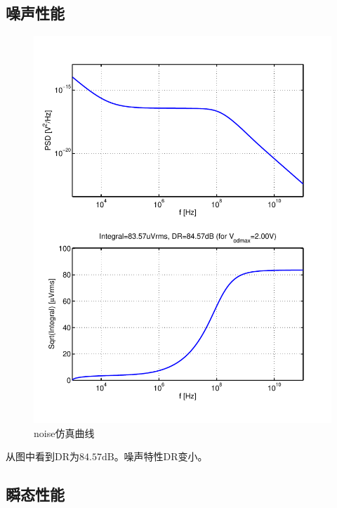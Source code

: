 \documentclass[a4paper]{article}
\newcommand{\udB}{\si{\deci\bel}}
\begin{document}
\subsection{噪声性能}
\begin{figure}[htb]
    \begin{center}
        \includegraphics[width=\textwidth]{slow/noise.pdf}
    \end{center}
    \caption{noise仿真曲线}
    \label{slownoise}
\end{figure}
从图中看到DR为$84.57\udB$。噪声特性DR变小。
\newpage
\clearpage
\subsection{瞬态性能}
\end{document}
